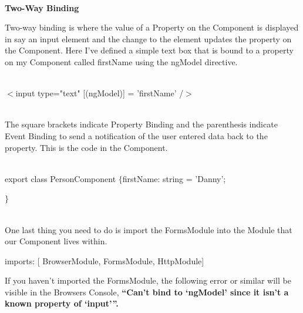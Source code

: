 \documentclass{article}
\begin{document}
\noindent 

\noindent \textbf{}
\\  

{\normalsize {\Large {\large \noindent \textbf{Two-Way Binding}}}}

\noindent Two-way binding is where the value of a Property on the Component is displayed in say an input element and the change to the element updates the property on the Component. Here I've defined a simple text box that is bound to a property on my Component called firstName using the ngModel directive.

\noindent 

\noindent \\ $\mathrm{<}$input type="text" [(ngModel)] = 'firstName' /$\mathrm{>}$

\noindent \\ The square brackets indicate Property Binding and the parenthesis indicate Event Binding to send a notification of the user entered data back to the property. This is the code in the Component.

\noindent 

\noindent \\ export class PersonComponent $\mathrm{\{}$firstName: string = 'Danny';

\noindent $\mathrm{\}}$

\noindent 

\noindent \\ One last thing you need to do is import the FormsModule into the Module that our Component lives within.

\noindent imports: [ BrowserModule, FormsModule, HttpModule]

\noindent If you haven't imported the FormsModule, the following error or similar will be visible in the Browsers Console, \textbf{``Can't bind to `ngModel' since it isn't a known property of `input'''.}
\end{document}
